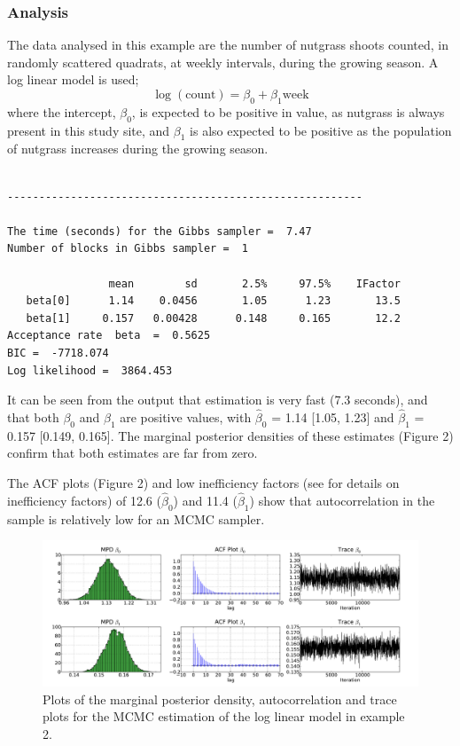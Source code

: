 \documentclass[article]{jss}
\begin{document}
\subsubsection{Analysis}

The data analysed in this example are the number of nutgrass shoots
counted, in randomly scattered quadrats, at weekly intervals, during
the growing season. A log linear model is used; \begin{equation}
  \log(\mbox{count})=\beta_{0}+\beta_{1}\mbox{week}\end{equation}
where the intercept, $\beta_{0}$, is expected to be positive in value,
as nutgrass is always present in this study site, and $\beta_{1}$ is
also expected to be positive as the population of nutgrass increases
during the growing season.

\begin{verbatim}

--------------------------------------------------------

The time (seconds) for the Gibbs sampler =  7.47
Number of blocks in Gibbs sampler =  1

                mean        sd       2.5%     97.5%    IFactor
   beta[0]      1.14    0.0456       1.05      1.23       13.5
   beta[1]     0.157   0.00428      0.148     0.165       12.2
Acceptance rate  beta  =  0.5625
BIC =  -7718.074
Log likelihood =  3864.453

\end{verbatim}

It can be seen from the output that estimation is very fast (7.3
seconds), and that both $\beta_{0}$ and $\beta_{1}$ are positive
values, with $\hat{\beta}_{0}$ = 1.14 {[}1.05, 1.23{]} and
$\hat{\beta}_{1}$ = 0.157 {[}0.149, 0.165{]}. The marginal posterior
densities of these estimates (Figure 2) confirm that both estimates
are far from zero.

The ACF plots (Figure 2) and low inefficiency factors (see
\citet{ChibGreenberg1996} for details on inefficiency factors) of 12.6
($\hat{\beta}_{0}$) and 11.4 ($\hat{\beta}_{1}$) show that
autocorrelation in the sample is relatively low for an MCMC sampler. %
\begin{figure}[t!]
  \begin{center}
    \includegraphics[width=16cm]{ex_loglinear.pdf}
  \end{center}
\caption{Plots of the marginal posterior density, autocorrelation and trace
plots for the MCMC estimation of the log linear model in example 2.}

\end{figure}
\end{document}
